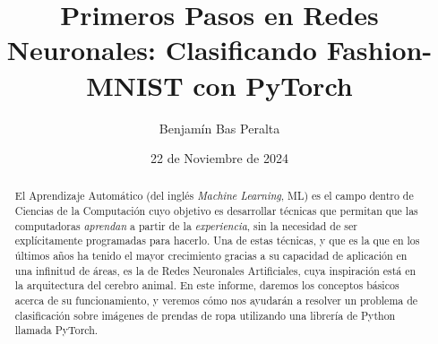 \documentclass[aps,twocolumn,groupedaddress]{revtex4-2}
\begin{document}

\title{
Primeros Pasos en Redes Neuronales: Clasificando Fashion-MNIST con PyTorch
}


\author{Benjamín Bas Peralta}

\date{22 de Noviembre de 2024}

\begin{abstract}
El Aprendizaje Automático (del inglés \textit{Machine Learning}, ML) es el campo dentro de Ciencias de la Computación cuyo objetivo es desarrollar técnicas que permitan que las computadoras \textit{aprendan} a partir de la \textit{experiencia}, sin la necesidad de ser explícitamente programadas para hacerlo. Una de estas técnicas, y que es la que en los últimos años ha tenido el mayor crecimiento gracias a su capacidad de aplicación en una infinitud de áreas, es la de Redes Neuronales Artificiales, cuya inspiración está en la arquitectura del cerebro animal. En este informe, daremos los conceptos básicos acerca de su funcionamiento, y veremos cómo nos ayudarán a resolver un problema de clasificación sobre imágenes de prendas de ropa utilizando una librería de Python llamada PyTorch.
\end{abstract}
\end{document}
